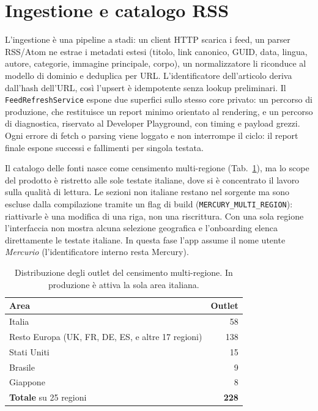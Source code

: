 \section{Ingestione e catalogo RSS}
\label{sec:catalogo-rss}
L'ingestione è una pipeline a stadi: un client HTTP scarica i feed, un
parser RSS/Atom ne estrae i metadati estesi (titolo, link canonico,
GUID, data, lingua, autore, categorie, immagine principale, corpo), un
normalizzatore li riconduce al modello di dominio e deduplica per URL.
L'identificatore dell'articolo deriva dall'hash dell'URL, così
l'upsert è idempotente senza lookup preliminari. Il
\texttt{FeedRefreshService} espone due superfici sullo stesso core
privato: un percorso di produzione, che restituisce un report minimo
orientato al rendering, e un percorso di diagnostica, riservato al
Developer Playground, con timing e payload grezzi. Ogni errore di fetch
o parsing viene loggato e non interrompe il ciclo: il report finale
espone successi e fallimenti per singola testata.

Il catalogo delle fonti nasce come censimento multi-regione
(Tab.~\ref{tab:rss-regioni}), ma lo scope del prodotto è ristretto alle
sole testate italiane, dove si è concentrato il lavoro sulla qualità di
lettura. Le sezioni non italiane restano nel sorgente ma sono escluse
dalla compilazione tramite un flag di build
(\texttt{MERCURY\_MULTI\_REGION}): riattivarle è una modifica di una
riga, non una riscrittura. Con una sola regione l'interfaccia non mostra
alcuna selezione geografica e l'onboarding elenca direttamente le
testate italiane. In questa fase l'app assume il nome utente
\emph{Mercurio} (l'identificatore interno resta Mercury).

\begin{table}[h]
\centering
\small
\caption{Distribuzione degli outlet del censimento multi-regione.
In produzione è attiva la sola area italiana.}
\label{tab:rss-regioni}
\begin{tabular}{lr}
\toprule
\textbf{Area} & \textbf{Outlet} \\
\midrule
Italia                                             & 58 \\
Resto Europa (UK, FR, DE, ES, e altre 17 regioni)  & 138 \\
Stati Uniti                                        & 15 \\
Brasile                                            & 9 \\
Giappone                                           & 8 \\
\midrule
\textbf{Totale} su 25 regioni                      & \textbf{228} \\
\bottomrule
\end{tabular}
\end{table}

